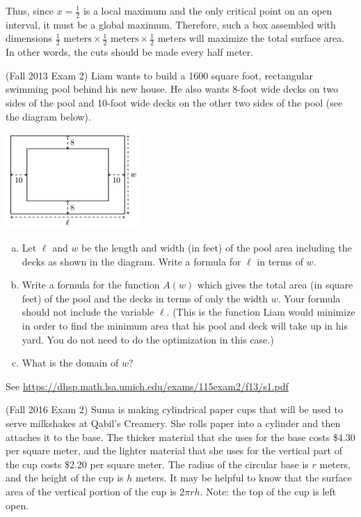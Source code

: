 \documentclass[11pt]{exam}
\begin{document}
\begin{questions}
\begin{solution}
    Thus, since \(x = \frac{1}{2}\) is a local maximum and the only
    critical point on an open interval, it must be a global
    maximum. Therefore, such a box assembled with dimensions
    \(\frac{1}{2} \text{ meters} \times \frac{1}{2} \text{ meters}
    \times \frac{1}{2} \text{ meters}\) will maximize the total
    surface area. In other words, the cuts should be made every half meter.
\end{solution}
\pagebreak
\question (Fall 2013 Exam 2) %
Liam wants to build a 1600 square foot, rectangular swimming pool behind his new house. He also wants 8-foot wide decks on two sides of the pool
and 10-foot wide decks on the other two sides of the pool (see the diagram below).
\begin{center}
	\includegraphics[width=2in]{Figures/pool.jpg}
\end{center}

\begin{enumerate}[(a)]
	
	\item  Let $\ell$ and $w$ be the length and width (in feet) of the pool area including the
	decks as shown in the diagram. Write a formula for $\ell$ in terms of $w$.
	
	
	\item  Write a formula for the function $A(w)$ which gives the total area (in square
	feet) of the pool and the decks in terms of only the width $w$. Your formula should not
	include the variable $\ell$.   (This is the function Liam would minimize in order to find the
	minimum area that his pool and deck will take up in his yard. You do not need to do the
	optimization in this case.)
	
	
	\item  What is the domain of $w$?
	
\end{enumerate}
\begin{solution}
  See \href{https://dhsp.math.lsa.umich.edu/exams/115exam2/f13/s1.pdf}{https://dhsp.math.lsa.umich.edu/exams/115exam2/f13/s1.pdf}
\end{solution}
\vspace{0.75in}
\question (Fall 2016 Exam 2) %
	Suma is making cylindrical paper cups that will be used to serve milkshakes at Qabil’s Creamery. She rolls paper into a cylinder and then attaches it to the base. The thicker material that she uses for the base costs \$4.30 per square meter, and the lighter material that she uses for the vertical part of the cup costs \$2.20 per square meter. The radius of the circular base is $r$ meters, and the height of the cup is $h$ meters.
	It may be helpful to know that the surface area of the vertical portion of the cup is $2 \pi r h$.
Note: the top of the cup is left open.


\end{questions}
\end{document}
